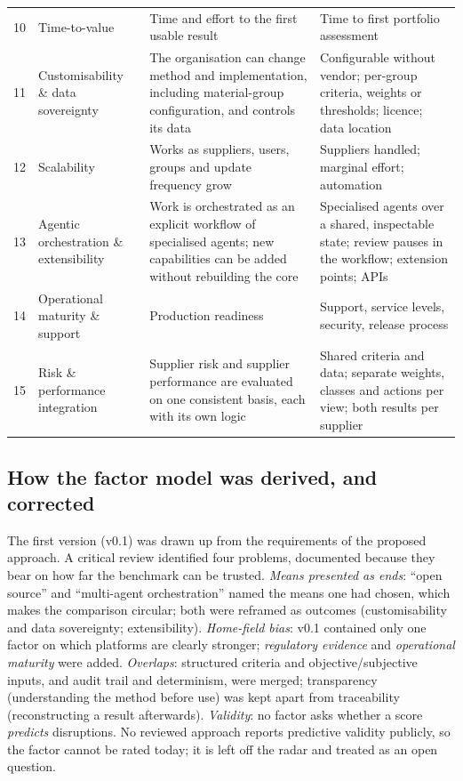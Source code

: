 \documentclass[10pt,twocolumn,a4paper]{article}
\begin{document}
\begin{table}[t]
\begin{tabular}{@{}P{0.02\textwidth}P{0.20\textwidth}P{0.345\textwidth}P{0.345\textwidth}@{}}
    10 & Time-to-value & Time and effort to the first usable result & Time to first portfolio assessment \\
    11 & Customisability \& data sovereignty & The organisation can change method and implementation, including material-group configuration, and controls its data & Configurable without vendor; per-group criteria, weights or thresholds; licence; data location \\
    12 & Scalability & Works as suppliers, users, groups and update frequency grow & Suppliers handled; marginal effort; automation \\
    13 & Agentic orchestration \& extensibility & Work is orchestrated as an explicit workflow of specialised agents; new capabilities can be added without rebuilding the core & Specialised agents over a shared, inspectable state; review pauses in the workflow; extension points; APIs \\
    14 & Operational maturity \& support & Production readiness & Support, service levels, security, release process \\
    15 & Risk \& performance integration & Supplier risk and supplier performance are evaluated on one consistent basis, each with its own logic & Shared criteria and data; separate weights, classes and actions per view; both results per supplier \\
    \bottomrule
  \end{tabular}
\end{table}

\subsection{How the factor model was derived, and corrected}
The first version (v0.1) was drawn up from the requirements of the proposed approach. A
critical review identified four problems, documented because they bear on how far the
benchmark can be trusted. \emph{Means presented as ends}: ``open source'' and
``multi-agent orchestration'' named the means one had chosen, which makes the comparison
circular; both were reframed as outcomes (customisability and data sovereignty;
extensibility). \emph{Home-field bias}: v0.1 contained only one factor on which
platforms are clearly stronger; \emph{regulatory evidence} and \emph{operational
maturity} were added. \emph{Overlaps}: structured criteria and objective/subjective
inputs, and audit trail and determinism, were merged; transparency (understanding the
method before use) was kept apart from traceability (reconstructing a result
afterwards). \emph{Validity}: no factor asks whether a score \emph{predicts}
disruptions. No reviewed approach reports predictive validity publicly, so the factor
cannot be rated today; it is left off the radar and treated as an open question.
\end{document}
